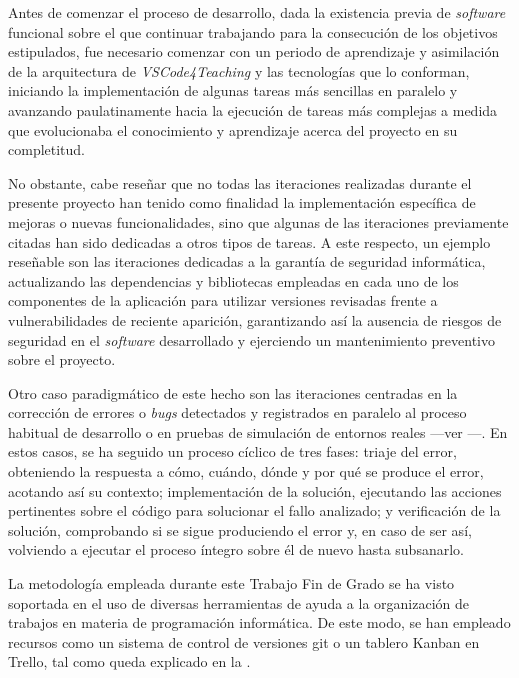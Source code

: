 Antes de comenzar el proceso de desarrollo, dada la existencia previa de \textit{software} funcional sobre el que continuar trabajando para la consecución de los objetivos estipulados, fue necesario comenzar con un periodo de aprendizaje y asimilación de la arquitectura de \textit{VSCode4Teaching} y las tecnologías que lo conforman, iniciando la implementación de algunas tareas más sencillas en paralelo y avanzando paulatinamente hacia la ejecución de tareas más complejas a medida que evolucionaba el conocimiento y aprendizaje acerca del proyecto en su completitud.

No obstante, cabe reseñar que no todas las iteraciones realizadas durante el presente proyecto han tenido como finalidad la implementación específica de mejoras o nuevas funcionalidades, sino que algunas de las iteraciones previamente citadas han sido dedicadas a otros tipos de tareas. A este respecto, un ejemplo reseñable son las iteraciones dedicadas a la garantía de seguridad informática, actualizando las dependencias y bibliotecas empleadas en cada uno de los componentes de la aplicación para utilizar versiones revisadas frente a vulnerabilidades de reciente aparición, garantizando así la ausencia de riesgos de seguridad en el \textit{software} desarrollado y ejerciendo un mantenimiento preventivo sobre el proyecto.

Otro caso paradigmático de este hecho son las iteraciones centradas en la corrección de errores o \textit{bugs} detectados y registrados en paralelo al proceso habitual de desarrollo o en pruebas de simulación de entornos reales ---ver ---. En estos casos, se ha seguido un proceso cíclico de tres fases: triaje del error, obteniendo la respuesta a cómo, cuándo, dónde y por qué se produce el error, acotando así su contexto; implementación de la solución, ejecutando las acciones pertinentes sobre el código para solucionar el fallo analizado; y verificación de la solución, comprobando si se sigue produciendo el error y, en caso de ser así, volviendo a ejecutar el proceso íntegro sobre él de nuevo hasta subsanarlo.

La metodología empleada durante este Trabajo Fin de Grado se ha visto soportada en el uso de diversas herramientas de ayuda a la organización de trabajos en materia de programación informática. De este modo, se han empleado recursos como un sistema de control de versiones git o un tablero Kanban en Trello, tal como queda explicado en la .

